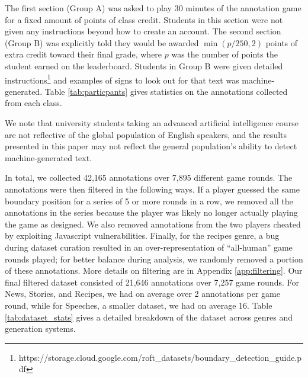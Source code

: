 The first section (Group A) was asked to play 30 minutes of the \ROFT{} annotation game for a fixed amount of points of class credit.
Students in this section were not given any instructions beyond how to create an account.
The second section (Group B) was explicitly told they would be awarded $\min(p/250, 2)$ points of extra credit toward their final grade, where $p$ was the number of points the student earned on the \ROFT{} leaderboard.
Students in Group B were given detailed instructions\footnote{
{\tiny{https://storage.cloud.google.com/roft\_datasets/boundary\_detection\_guide.pdf}}
} and examples of signs to look out for that text was machine-generated.
Table \ref{tab:particpants} gives statistics on the annotations collected from each class.

We note that university students taking an advanced artificial intelligence course are not reflective of the global population of English speakers, and the results presented in this paper may not reflect the general population's ability to detect machine-generated text. 

In total, we collected 42,165 annotations over 7,895 different game rounds.
The annotations were then filtered in the following ways.
If a player guessed the same boundary position for a series of 5 or more rounds in a row, we removed all the annotations in the series because the player was likely no longer actually playing the game as designed.
We also removed annotations from the two players cheated by exploiting Javascript vulnerabilities.
Finally, for the recipes genre, a bug during dataset curation resulted in an over-representation of ``all-human'' game rounds played;
for better balance during analysis, we randomly removed a portion of these annotations.
More details on filtering are in Appendix \ref{app:filtering}.
Our final filtered dataset consisted of 21,646 annotations over 7,257 game rounds.
For News, Stories, and Recipes, we had on average over 2 annotations per game round, while for Speeches, a smaller dataset, we had on average 16.
Table \ref{tab:dataset_stats} gives a detailed breakdown of the dataset across genres and generation systems.


